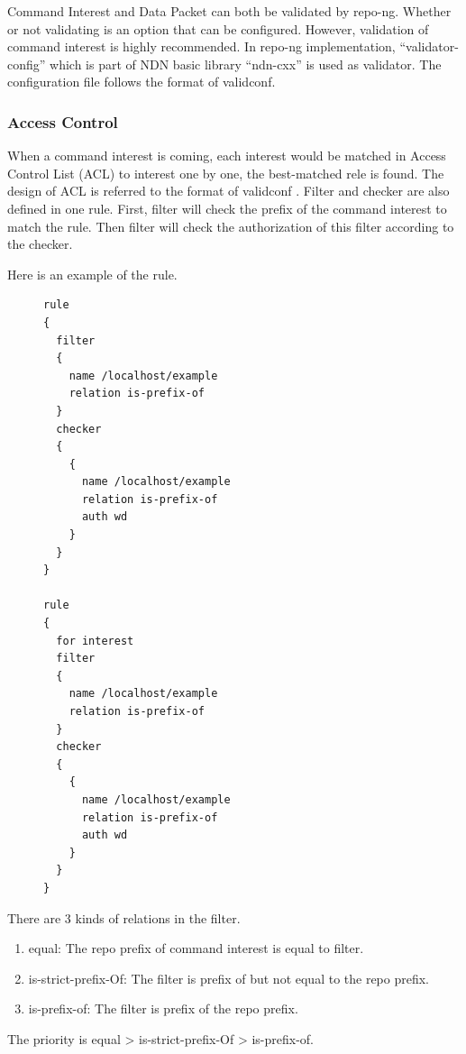 \documentclass{acm_proc_article-sp}
\begin{document}
Command Interest and Data Packet can both be validated by repo-ng. Whether or not validating is an option that can be configured. However, validation of command interest is highly recommended. In repo-ng implementation, ``validator-config'' which is part of NDN basic library ``ndn-cxx'' is used as validator. The configuration file follows the format of validconf. \cite{validconf}

\subsubsection{Access Control}
When a command interest is coming, each interest would be matched in Access Control List (ACL) to interest one by one, the best-matched rele is found. The design of ACL is referred to the format of validconf \cite{validconf}. Filter and checker are also defined in one rule. First, filter will check the prefix of the command interest to match the rule. Then filter will check the authorization of this filter according to the checker.

Here is an example of the rule.

\begin{figure}[!hbp]
\begin{framed}
\begin{BVerbatim}
rule
{
  filter
  {
    name /localhost/example
    relation is-prefix-of
  }
  checker
  {
    {
      name /localhost/example
      relation is-prefix-of
      auth wd
    }
  }
}

rule
{
  for interest
  filter
  {
    name /localhost/example
    relation is-prefix-of
  }
  checker
  {
    {
      name /localhost/example
      relation is-prefix-of
      auth wd
    }
  }
}

\end{BVerbatim}
\end{framed}
\end{figure}

There are 3 kinds of relations in the filter.

\begin{enumerate}
\item equal: The repo prefix of command interest is equal to filter.
\item is-strict-prefix-Of: The filter is prefix of but not equal to the repo prefix.
\item is-prefix-of: The filter is prefix of the repo prefix.
\end{enumerate}

The priority is equal > is-strict-prefix-Of > is-prefix-of.
\end{document}
